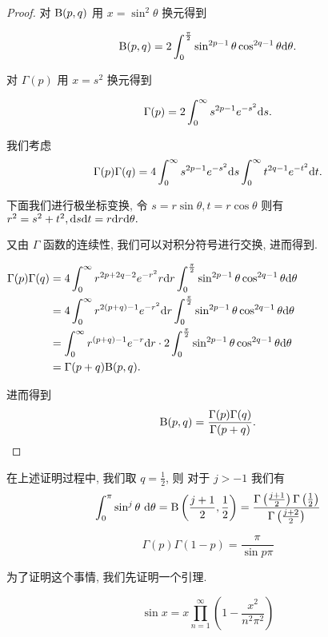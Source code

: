 \begin{proof}
	对 $\text {B}(p,q)$ 用 $x=\sin^2\theta$ 换元得到

	$$\text {B}(p,q)=2\int_0^{\frac \pi 2} \sin ^{2p-1}\theta \cos ^{2q-1} \theta \text {d} \theta.$$

	对 $\Gamma(p)$ 用 $x=s^2$ 换元得到

	$$\Gamma(p)=2\int_0^\infty s^{2p-1}e^{-s^2}\text {d} s.$$

	我们考虑 $$\Gamma(p)\Gamma(q)=4\int_0^\infty s^{2p-1}e^{-s^2}\text {d} s\int_0^\infty t^{2q-1}e^{-t^2}\text {d} t.$$

	下面我们进行极坐标变换, 令 $s=r\sin\theta,t=r\cos\theta$ 则有 $r^2=s^2+t^2,\text {d} s \text {d} t=r\text {d} r \text {d} \theta.$

	又由 $\Gamma$ 函数的连续性, 我们可以对积分符号进行交换, 进而得到.
	\begin{center}
		$
		\begin{aligned}
			\Gamma(p)\Gamma(q)&=4\int_0^\infty r^{2p+2q-2}e^{-r^2}r\text {d} r \int_0^{\frac \pi 2}\sin^{2p-1}\theta\cos^{2q-1}\theta \text {d} \theta\\
			&=4\int_0^\infty r^{2(p+q)-1}e^{-r^2}\text {d} r \int_0^{\frac \pi 2}\sin^{2p-1}\theta\cos^{2q-1}\theta \text {d} \theta\\
			&=\int_0^\infty r^{(p+q)-1}e^{-r}\text {d} r \cdot 2\int_0^{\frac \pi 2}\sin^{2p-1}\theta\cos^{2q-1}\theta \text {d} \theta\\
			&=\Gamma(p+q)\text {B}(p,q).
		\end{aligned}
		$
	\end{center}

	进而得到
	$$\text {B}(p,q)=\dfrac{\Gamma(p)\Gamma(q)}{\Gamma(p+q)}.$$
\end{proof}


\begin{corollary}
	在上述证明过程中, 我们取 $q=\frac{1}{2}$, 则 对于 $j>-1$ 我们有 $$\int_0^\pi \sin^j \theta\ \text {d}\theta = \text {B}\left(\frac{j+1}{2},\frac 1 2\right)=\frac{\Gamma\left(\frac{j+1} 2\right)\Gamma\left(\frac 1 2\right)}{\Gamma\left(\frac{j+2} 2\right)}$$
\end{corollary}

\begin{property}[余元公式]\label{余元公式}
	$$\Gamma(p)\Gamma(1-p)=\frac{\pi}{\sin p\pi}$$
\end{property}

为了证明这个事情, 我们先证明一个引理.

\begin{lemma}\label{lemma:sin}
	$$\sin x = x \prod\limits_{n=1}^\infty \left(1-\dfrac{x^2}{n^2\pi^2}\right)$$
\end{lemma}

